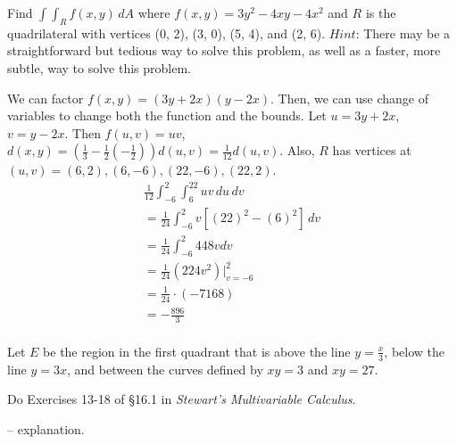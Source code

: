 \documentclass[12pt]{exam}
\begin{document}
\begin{questions}
\question Find $\int\int_R f(x, y)\, dA$ where $f(x, y) = 3y^2 - 4xy - 4x^2$ and $R$ is the quadrilateral with vertices (0, 2), (3, 0), (5, 4), and (2, 6). $Hint$: There may be a straightforward but tedious way to solve this problem, as well as a faster, more subtle, way to solve this problem.
	\begin{solution}
		We can factor $f(x, y) = (3y+2x)(y-2x)$. Then, we can use change of variables to change both the function and the bounds. Let $u = 3y + 2x$, $v = y - 2x$. Then $f(u, v) = uv$, $d(x, y) = \left(\frac{1}{3}-\frac{1}{2}\left(-\frac{1}{2}\right)\right)d(u, v) = \frac{1}{12}d(u, v)$. Also, $R$ has vertices at $(u, v) = (6, 2), (6, -6), (22, -6), (22, 2)$.\\
		\begin{gather*}
			\frac{1}{12} \int_{-6}^{2} \int_{6}^{22} uv \, du\, dv \\
			= \frac{1}{24} \int_{-6}^{2} v \left[\left(22\right)^2 - \left(6\right)^2 \right]\, dv \\
			= \frac{1}{24} \int_{-6}^{2} 448 v dv \\
			= \frac{1}{24} \left(224 v^2\right)|_{v=-6}^{2} \\
			= \frac{1}{24} \cdot (-7168) \\
			= -\frac{896}{3} \\
		\end{gather*}
	\end{solution}
\question Let $E$ be the region in the ﬁrst quadrant that is above the line $y = \frac{x}{3}$, below the line $y = 3x$, and
between the curves deﬁned by $xy = 3$ and $xy = 27$.
\question Do Exercises 13-18 of §16.1 in \emph{Stewart's Multivariable Calculus}.
	\begin{solution}
		\begin{questions}
			\setcounter{question}{12}
			\question \boxed{} -- explanation.
			

\end{questions}
\end{solution}
\end{questions}
\end{document}
